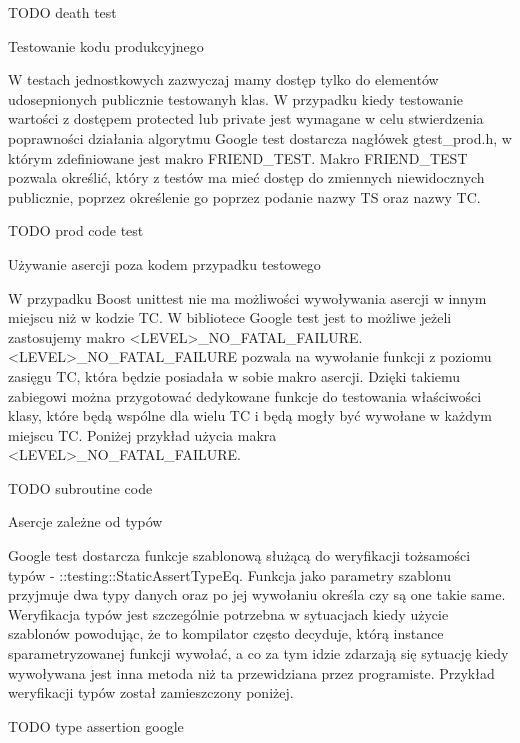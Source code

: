 TODO death test

Testowanie kodu produkcyjnego

W testach jednostkowych zazwyczaj mamy dostęp tylko do elementów udosepnionych publicznie testowanyh klas. W przypadku kiedy testowanie wartości z dostępem protected lub private jest wymagane w celu stwierdzenia poprawności działania algorytmu Google test dostarcza nagłówek gtest\gtest_prod.h, w którym zdefiniowane jest makro FRIEND_TEST.
Makro FRIEND_TEST pozwala określić, który z testów ma mieć dostęp do zmiennych niewidocznych publicznie, poprzez określenie go poprzez podanie nazwy TS oraz nazwy TC.

TODO prod code test

Używanie asercji poza kodem przypadku testowego

W przypadku Boost unittest nie ma możliwości wywoływania asercji w innym miejscu niż w kodzie TC. W bibliotece Google test jest to możliwe jeżeli zastosujemy makro <LEVEL>_NO_FATAL_FAILURE.
<LEVEL>_NO_FATAL_FAILURE pozwala na wywołanie funkcji z poziomu zasięgu TC, która będzie posiadała w sobie makro asercji. Dzięki takiemu zabiegowi można przygotować dedykowane funkcje do testowania właściwości klasy, które będą wspólne dla wielu TC i będą mogły być wywołane w każdym miejscu TC. Poniżej przykład użycia makra <LEVEL>_NO_FATAL_FAILURE.

TODO subroutine code

Asercje zależne od typów

Google test dostarcza funkcje szablonową służącą do weryfikacji tożsamości typów - ::testing::StaticAssertTypeEq. Funkcja jako parametry szablonu przyjmuje dwa typy danych oraz po jej wywołaniu określa czy są one takie same.
Weryfikacja typów jest szczególnie potrzebna w sytuacjach kiedy użycie szablonów powodując, że to kompilator często decyduje, którą instance sparametryzowanej funkcji wywołać, a co za tym idzie zdarzają się sytuację kiedy wywoływana jest inna metoda niż ta przewidziana przez programiste.
Przykład weryfikacji typów został zamieszczony poniżej.

TODO type assertion google